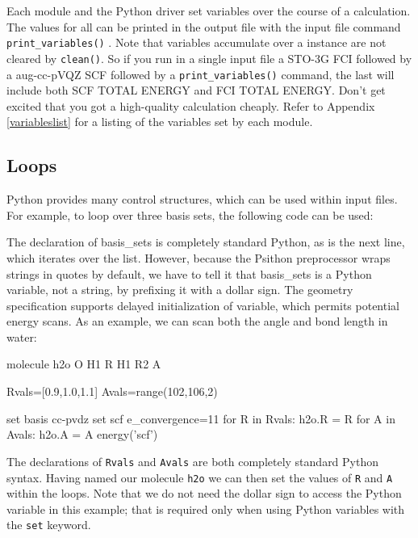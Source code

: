 Each module and the Python driver set \PSI variables over the course of
a calculation.  The values for all can be printed in the output file
with the input file command \texttt{print\_variables()} . Note that
\PSI variables accumulate over a \PSIfour instance are not cleared by
\texttt{clean()}. So if you run in a single input file a STO-3G FCI
followed by a aug-cc-pVQZ SCF followed by a \texttt{print\_variables()}
command, the last will include both SCF TOTAL ENERGY and FCI TOTAL
ENERGY. Don't get excited that you got a high-quality calculation
cheaply. Refer to Appendix \ref{variableslist} for a listing of the
variables set by each module.

\subsection{Loops}
Python provides many control structures, which can be used within \PSIfour
input files. For example, to loop over three basis sets, the following code can
be used:
The declaration of basis\_sets is completely standard Python, as is the next
line, which iterates over the list. However, because the Psithon preprocessor
wraps strings in quotes by default, we have to tell it that basis\_sets is a
Python variable, not a string, by prefixing it with a dollar sign. The geometry
specification supports delayed initialization of variable, which permits
potential energy scans. As an example, we can scan both the angle and bond
length in water:
\begin{Snippet}
molecule h2o{
  O
  H1 R
  H1 R2 A
}

Rvals=[0.9,1.0,1.1]
Avals=range(102,106,2)

set basis cc-pvdz
set scf e_convergence=11
for R in Rvals:
    h2o.R = R
    for A in Avals:
        h2o.A = A
        energy('scf')
\end{Snippet}
The declarations of {\tt Rvals} and {\tt Avals} are both completely standard Python syntax.
Having named our molecule {\tt h2o} we can then set the values of {\tt R} and {\tt A} within
the loops. Note that we do not need the dollar sign to access the Python
variable in this example; that is required only when using Python variables
with the {\tt set} keyword.

